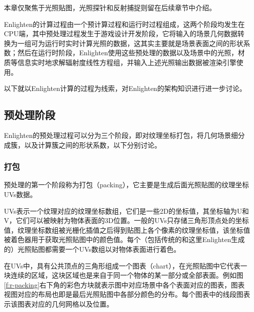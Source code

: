 本章仅聚焦于光照贴图，光照探针和反射捕捉则留在后续章节中介绍。

Enlighten的计算过程由一个预计算过程和运行时过程组成，这两个阶段均发生在CPU端，其中预处理过程发生于游戏设计开发阶段，它将输入的场景几何数据转换为一组可为运行时实时计算光照的数据，这其实主要就是场景表面之间的形状系数；然后在运行时阶段，Enlighten使用这些预处理的数据以及场景中的光照，材质等信息实时地求解辐射度线性方程组，并输入上述光照输出数据被渲染引擎使用。

以下就以Enlighten计算的过程为线索，对Enlighten的架构知识进行进一步讨论。




\subsection{预处理阶段}
Enlighten的预处理过程可以分为三个阶段，即对纹理坐标打包，将几何场景细分成簇，以及计算簇之间的形状系数，以下分别讨论。



\subsubsection{打包}\label{sec:r-packing}
预处理的第一个阶段称为打包（packing），它主要是生成后面光照贴图的纹理坐标UVs数据。

UVs表示一个纹理对应的纹理坐标数组，它们是一些2D的坐标值，其坐标轴为U和V，它们可以被映射为物体表面的3D位置。一般的UVs只存储三角形顶点处的坐标值，纹理坐标数组被光栅化插值之后得到贴图上各个像素的纹理坐标值，该坐标值被着色器用于获取光照贴图中的颜色值。每个（包括传统的和这里Enlighten生成的）光照贴图都需要一个UVs数组以对物体表面进行着色。

在UVs中，具有公共顶点的三角形组成一个图表（chart），在光照贴图中它代表一块连续的区域，这块区域也是来自于同一个物体的某一部分或全部表面。例如图\ref{f:r-packing}右下角的彩色方块就表示图中对应场景中各个表面对应的图表，图表视图对应的布局也即是最后光照贴图中各部分颜色的分布。每个图表中的线段图表示该图表对应的几何网格以及位置。

